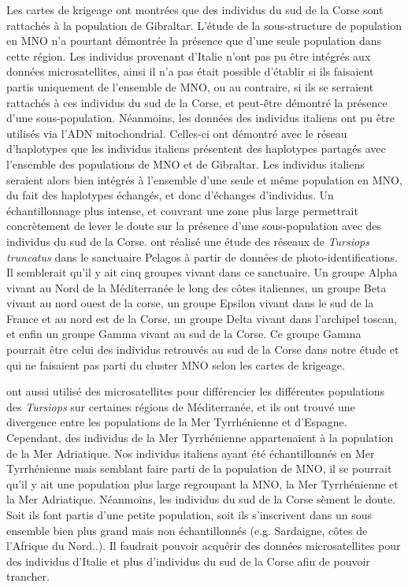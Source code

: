 \documentclass[a4paper,12pt,twoside]{article}\usepackage[]{graphicx}\usepackage[]{color}
\begin{document}
Les cartes de krigeage ont montrées que des individus du sud de la Corse sont rattachés à la population de Gibraltar. L'étude de la sous-structure de population en MNO n'a pourtant démontrée la présence que d'une seule population dans cette région. Les individus provenant d'Italie n'ont pas pu être intégrés aux données microsatellites, ainsi il n'a pas était possible d'établir si ils faisaient partis uniquement de l'ensemble de MNO, ou au contraire, si ils se serraient rattachés à ces individus du sud de la Corse, et peut-être démontré la présence d'une sous-population. Néanmoins, les données des individus italiens ont pu être utilisés via l'ADN mitochondrial. Celles-ci ont démontré avec le réseau d'haplotypes que les individus italiens présentent des haplotypes partagés avec l'ensemble des populations de MNO et de Gibraltar. Les individus italiens seraient alors bien intégrés à l'ensemble d'une seule et même population en MNO, du fait des haplotypes échangés, et donc d'échanges d'individus. Un échantillonnage plus intense, et couvrant une zone plus large permettrait concrètement de lever le doute sur la présence d'une sous-population avec des individus du sud de la Corse. \citet{carnabuci2016} ont réalisé une étude des réseaux de \emph{Tursiops truncatus} dans le sanctuaire Pelagos à partir de données de photo-identifications. Il semblerait qu'il y ait cinq groupes vivant dans ce sanctuaire. Un groupe Alpha vivant au Nord de la Méditerranée le long des côtes italiennes, un groupe Beta vivant au nord ouest de la corse, un groupe Epsilon vivant dans le sud de la France et au nord est de la Corse, un groupe Delta vivant dans l'archipel toscan, et enfin un groupe Gamma vivant au sud de la Corse. Ce groupe Gamma pourrait être celui des individus retrouvés au sud de la Corse dans notre étude et qui ne faisaient pas parti du cluster MNO selon les cartes de krigeage.

\citet{natoli2005habitat} ont aussi utilisé des microsatellites pour différencier les différentes populations des \emph{Tursiops} sur certaines régions de Méditerranée, et ils ont trouvé une divergence entre les populations de la Mer Tyrrhénienne et d'Espagne. Cependant, des individus de la Mer Tyrrhénienne appartenaient à la population de la Mer Adriatique. Nos individus italiens ayant été échantillonnés en Mer Tyrrhénienne mais semblant faire parti de la population de MNO, il se pourrait qu'il y ait une population plus large regroupant la MNO, la Mer Tyrrhénienne et la Mer Adriatique. Néanmoins, les individus du sud de la Corse sèment le doute. Soit ils font partis d'une petite population, soit ils s'inscrivent dans un sous ensemble bien plus grand mais non échantillonnés (e.g. Sardaigne, côtes de l'Afrique du Nord..). Il faudrait pouvoir acquérir des données microsatellites pour des individus d'Italie et plus d'individus du sud de la Corse afin de pouvoir trancher.
\end{document}
